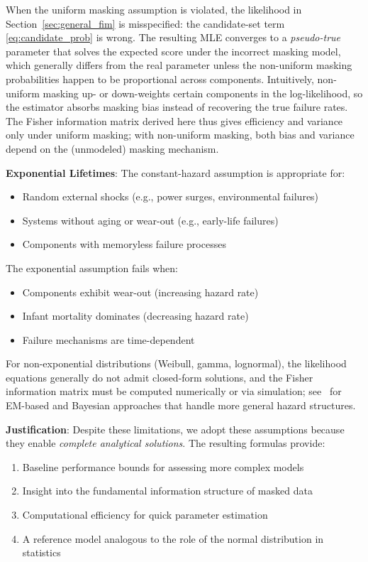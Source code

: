 \documentclass[pdflatex,sn-mathphys-num,Numbered]{sn-jnl}
\theoremstyle{thmstyleone}
\theoremstyle{thmstylethree}
\theoremstyle{thmstyletwo}
\begin{document}
When the uniform masking assumption is violated, the likelihood in Section~\ref{sec:general_fim} is misspecified: the candidate-set term \eqref{eq:candidate_prob} is wrong. The resulting MLE converges to a \emph{pseudo-true} parameter that solves the expected score under the incorrect masking model, which generally differs from the real parameter unless the non-uniform masking probabilities happen to be proportional across components. Intuitively, non-uniform masking up- or down-weights certain components in the log-likelihood, so the estimator absorbs masking bias instead of recovering the true failure rates. The Fisher information matrix derived here thus gives efficiency and variance only under uniform masking; with non-uniform masking, both bias and variance depend on the (unmodeled) masking mechanism.

\textbf{Exponential Lifetimes}: The constant-hazard assumption is appropriate for:
\begin{itemize}
\item Random external shocks (e.g., power surges, environmental failures)
\item Systems without aging or wear-out (e.g., early-life failures)
\item Components with memoryless failure processes
\end{itemize}

The exponential assumption fails when:
\begin{itemize}
\item Components exhibit wear-out (increasing hazard rate)
\item Infant mortality dominates (decreasing hazard rate)
\item Failure mechanisms are time-dependent
\end{itemize}

For non-exponential distributions (Weibull, gamma, lognormal), the likelihood equations generally do not admit closed-form solutions, and the Fisher information matrix must be computed numerically or via simulation; see~\cite{craiu2004,liu2021} for EM-based and Bayesian approaches that handle more general hazard structures.

\textbf{Justification}: Despite these limitations, we adopt these assumptions because they enable \emph{complete analytical solutions}. The resulting formulas provide:
\begin{enumerate}
\item Baseline performance bounds for assessing more complex models
\item Insight into the fundamental information structure of masked data
\item Computational efficiency for quick parameter estimation
\item A reference model analogous to the role of the normal distribution in statistics
\end{enumerate}
\end{document}
